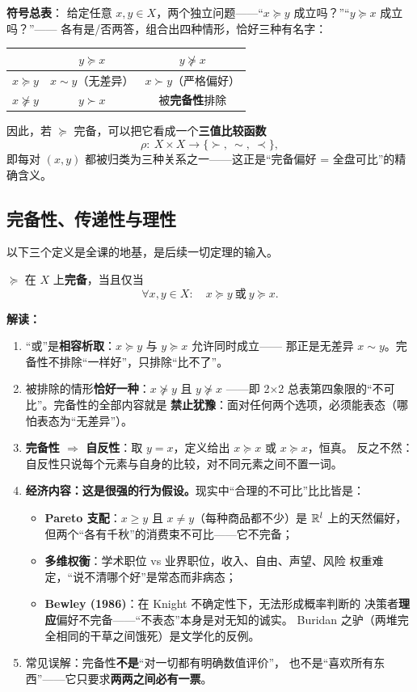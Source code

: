 \textbf{符号总表}：
给定任意 $x,y\in X$，两个独立问题——“$x\succeq y$ 成立吗？”“$y\succeq x$ 成立吗？”——
各有是/否两答，组合出四种情形，恰好三种有名字：
\begin{center}
\small
\begin{tabular}{c|cc}
\toprule
 & $y\succeq x$ & $y\not\succeq x$ \\
\midrule
$x\succeq y$ & $x\sim y$（无差异） & $x\succ y$（严格偏好） \\
$x\not\succeq y$ & $y\succ x$ & 被\textbf{完备性}排除 \\
\bottomrule
\end{tabular}
\end{center}
因此，若 $\succeq$ 完备，可以把它看成一个\textbf{三值比较函数}
\[
\rho:\ X\times X\longrightarrow \{\succ,\ \sim,\ \prec\},
\]
即每对 $(x,y)$ 都被归类为三种关系之一——这正是“完备偏好 = 全盘可比”的精确含义。

\subsection{完备性、传递性与理性}

以下三个定义是全课的地基，是后续一切定理的输入。

\begin{definition}\label{def:complete}
$\succeq$ 在 $X$ 上\textbf{完备}，当且仅当
\[
\forall x,y\in X:\quad x\succeq y\ \text{或}\ y\succeq x.
\]
\end{definition}

\textbf{解读：}
\begin{enumerate}
  \item “或”是\textbf{相容析取}：$x\succeq y$ 与 $y\succeq x$ 允许同时成立——
  那正是无差异 $x\sim y$。完备性不排除“一样好”，只排除“比不了”。
  \item 被排除的情形\textbf{恰好一种}：$x\not\succeq y$ 且 $y\not\succeq x$
  ——即 2×2 总表第四象限的“不可比”。完备性的全部内容就是
  \textbf{禁止犹豫}：面对任何两个选项，必须能表态（哪怕表态为“无差异”）。
  \item \textbf{完备性 $\Rightarrow$ 自反性}：取 $y=x$，定义给出 $x\succeq x$ 或
  $x\succeq x$，恒真。
  反之不然：自反性只说每个元素与自身的比较，对不同元素之间不置一词。
  \item \textbf{经济内容：这是很强的行为假设。}现实中“合理的不可比”比比皆是：
  \begin{itemize}
    \item \textbf{Pareto 支配}：$x\ge y$ 且 $x\neq y$（每种商品都不少）是
    $\mathbb{R}^l$ 上的天然偏好，但两个“各有千秋”的消费束不可比——它不完备；
    \item \textbf{多维权衡}：学术职位 vs 业界职位，收入、自由、声望、风险
    权重难定，“说不清哪个好”是常态而非病态；
    \item \textbf{Bewley (1986)}：在 Knight 不确定性下，无法形成概率判断的
    决策者\textbf{理应}偏好不完备——“不表态”本身是对无知的诚实。
    Buridan 之驴（两堆完全相同的干草之间饿死）是文学化的反例。
  \end{itemize}
  \item 常见误解：完备性\textbf{不是}“对一切都有明确数值评价”，
  也不是“喜欢所有东西”——它只要求\textbf{两两之间必有一票}。
\end{enumerate}

